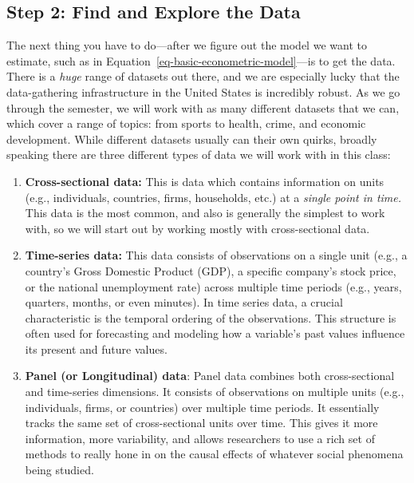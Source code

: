 \documentclass[
  letterpaper,
  DIV=11,
  numbers=noendperiod]{scrreprt}
\begin{document}
\subsection{Step 2: Find and Explore the
Data}\label{step-2-find-and-explore-the-data}

The next thing you have to do---after we figure out the model we want to
estimate, such as in Equation~\ref{eq-basic-econometric-model}---is to
get the data. There is a \emph{huge} range of datasets out there, and we
are especially lucky that the data-gathering infrastructure in the
United States is incredibly robust. As we go through the semester, we
will work with as many different datasets that we can, which cover a
range of topics: from sports to health, crime, and economic development.
While different datasets usually can their own quirks, broadly speaking
there are three different types of data we will work with in this class:

\begin{enumerate}
\def\labelenumi{\arabic{enumi}.}
\item
  \textbf{Cross-sectional data:} This is data which contains information
  on units (e.g., individuals, countries, firms, households, etc.) at a
  \emph{single point in time.} This data is the most common, and also is
  generally the simplest to work with, so we will start out by working
  mostly with cross-sectional data.
\item
  \textbf{Time-series data:} This data consists of observations on a
  single unit (e.g., a country's Gross Domestic Product (GDP), a
  specific company's stock price, or the national unemployment rate)
  across multiple time periods (e.g., years, quarters, months, or even
  minutes). In time series data, a crucial characteristic is the
  temporal ordering of the observations. This structure is often used
  for forecasting and modeling how a variable's past values influence
  its present and future values.
\item
  \textbf{Panel (or Longitudinal) data}: Panel data combines both
  cross-sectional and time-series dimensions. It consists of
  observations on multiple units (e.g., individuals, firms, or
  countries) over multiple time periods. It essentially tracks the same
  set of cross-sectional units over time. This gives it more
  information, more variability, and allows researchers to use a rich
  set of methods to really hone in on the causal effects of whatever
  social phenomena being studied.
\end{enumerate}
\end{document}
